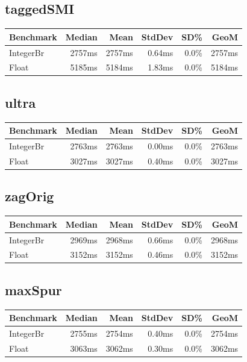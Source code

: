 {\subsection*{taggedSMI}
\begin{tabular}{|l|r|r|r|r|r|}
\hline
\textbf{Benchmark} & \textbf{Median} & \textbf{Mean} & \textbf{StdDev} & \textbf{SD\%} & \textbf{GeoM} \\ \hline
IntegerBr & 2757ms & 2757ms & 0.64ms & 0.0\% & 2757ms \\ \hline
Float & 5185ms & 5184ms & 1.83ms & 0.0\% & 5184ms \\ \hline
\end{tabular}

\subsection*{ultra}
\begin{tabular}{|l|r|r|r|r|r|}
\hline
\textbf{Benchmark} & \textbf{Median} & \textbf{Mean} & \textbf{StdDev} & \textbf{SD\%} & \textbf{GeoM} \\ \hline
IntegerBr & 2763ms & 2763ms & 0.00ms & 0.0\% & 2763ms \\ \hline
Float & 3027ms & 3027ms & 0.40ms & 0.0\% & 3027ms \\ \hline
\end{tabular}

\subsection*{zagOrig}
\begin{tabular}{|l|r|r|r|r|r|}
\hline
\textbf{Benchmark} & \textbf{Median} & \textbf{Mean} & \textbf{StdDev} & \textbf{SD\%} & \textbf{GeoM} \\ \hline
IntegerBr & 2969ms & 2968ms & 0.66ms & 0.0\% & 2968ms \\ \hline
Float & 3152ms & 3152ms & 0.46ms & 0.0\% & 3152ms \\ \hline
\end{tabular}

\subsection*{maxSpur}
\begin{tabular}{|l|r|r|r|r|r|}
\hline
\textbf{Benchmark} & \textbf{Median} & \textbf{Mean} & \textbf{StdDev} & \textbf{SD\%} & \textbf{GeoM} \\ \hline
IntegerBr & 2755ms & 2754ms & 0.40ms & 0.0\% & 2754ms \\ \hline
Float & 3063ms & 3062ms & 0.30ms & 0.0\% & 3062ms \\ \hline
\end{tabular}
}

